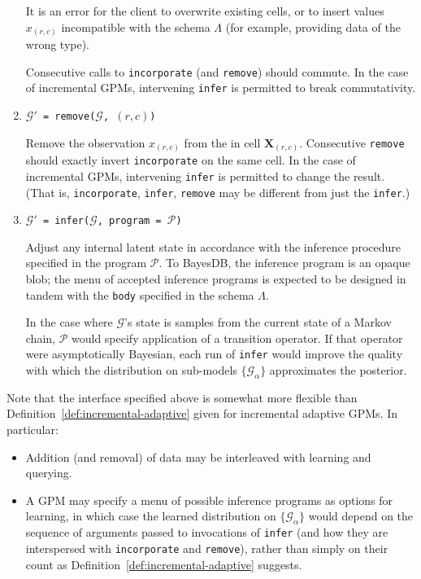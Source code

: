 \documentclass[10pt,letterpaper]{article}
\newcommand{\G}{\mathcal{G}}
\begin{document}
\begin{enumerate}
    It is an error for the client to overwrite existing cells, or to insert values
    $x_{(r,c)}$ incompatible with the schema $\Lambda$ (for example,
    providing data of the wrong type).

    Consecutive calls to \texttt{incorporate} (and \texttt{remove})
    should commute.  In the case of incremental GPMs, intervening
    \texttt{infer} is permitted to break commutativity.

\item \texttt{$\G'$ = remove($\G$, $(r,c)$)}

    Remove the observation $x_{(r,c)}$ from the in cell $\mathbf{X}_{(r,c)}$.
    Consecutive \texttt{remove} should exactly invert
    \texttt{incorporate} on the same cell.  In the case of incremental
    GPMs, intervening \texttt{infer} is permitted to change the
    result.  (That is, \texttt{incorporate}, \texttt{infer}, \texttt{remove}
    may be different from just the \texttt{infer}.)

\item \texttt{$\G'$ = infer($\G$, program = $\mathcal{P}$)}

    Adjust any internal latent state in accordance with the inference
    procedure specified in the program $\mathcal{P}$.  To BayesDB, the
    inference program is an opaque blob; the menu of accepted
    inference programs is expected to be designed in tandem with the
    \texttt{body} specified in the schema $\Lambda$.

    In the case where $\G$'s state is samples from the current state
    of a Markov chain, $\mathcal{P}$ would specify application of a
    transition operator.  If that operator were asymptotically
    Bayesian, each run of \texttt{infer} would improve the quality
    with which the distribution on sub-models $\{\G_\alpha\}$
    approximates the posterior.
\end{enumerate}

Note that the interface specified above is somewhat more flexible than
Definition~\ref{def:incremental-adaptive} given for incremental
adaptive GPMs.  In particular:

\begin{itemize}
\item Addition (and removal) of data may be interleaved with learning
  and querying.
\item A GPM may specify a menu of possible inference programs as
  options for learning, in which case the learned distribution on
  $\{\G_\alpha\}$ would depend on the sequence of arguments passed to invocations
  of \texttt{infer} (and how they are interspersed with
  \texttt{incorporate} and \texttt{remove}), rather than simply on
  their count as Definition~\ref{def:incremental-adaptive} suggests.
\end{itemize}
\end{document}
